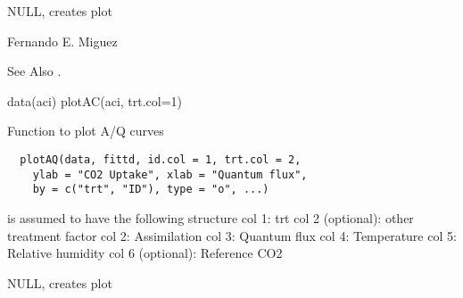 \documentclass[letterpaper]{book}
\begin{document}
%
\begin{Value}
NULL, creates plot
\end{Value}
%
\begin{Author}\relax
Fernando E. Miguez
\end{Author}
%
\begin{SeeAlso}\relax
See Also .
\end{SeeAlso}
%
\begin{Examples}
\begin{ExampleCode}
data(aci)
plotAC(aci, trt.col=1)
\end{ExampleCode}
\end{Examples}
%
\begin{Description}\relax
Function to plot A/Q curves
\end{Description}
%
\begin{Usage}
\begin{verbatim}
  plotAQ(data, fittd, id.col = 1, trt.col = 2,
    ylab = "CO2 Uptake", xlab = "Quantum flux",
    by = c("trt", "ID"), type = "o", ...)
\end{verbatim}
\end{Usage}
%
\begin{Arguments}
\begin{ldescription}
\item[\code{data}] is assumed to have the following structure
col 1: trt col 2 (optional): other treatment factor col
2: Assimilation col 3: Quantum flux col 4: Temperature
col 5: Relative humidity col 6 (optional): Reference CO2

\item[\code{fittd}] 

\item[\code{id.col}] 

\item[\code{trt.col}] 

\item[\code{ylab}] 

\item[\code{xlab}] 

\item[\code{by}] 

\item[\code{type}] 

\item[\code{...}] 
\end{ldescription}
\end{Arguments}
%
\begin{Value}
NULL, creates plot
\end{Value}
\end{document}
